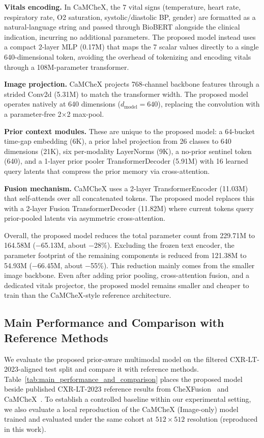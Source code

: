 \textbf{Vitals encoding.} In CaMCheX, the 7 vital signs (temperature, heart rate, respiratory rate, O2 saturation, systolic/diastolic BP, gender) are formatted as a natural-language string and passed through BioBERT alongside the clinical indication, incurring no additional parameters. The proposed model instead uses a compact 2-layer MLP (0.17M) that maps the 7 scalar values directly to a single 640-dimensional token, avoiding the overhead of tokenizing and encoding vitals through a 108M-parameter transformer.

\textbf{Image projection.} CaMCheX projects 768-channel backbone features through a strided Conv2d (5.31M) to match the transformer width. The proposed model operates natively at 640 dimensions ($d_\text{model} = 640$), replacing the convolution with a parameter-free 2$\times$2 max-pool.

\textbf{Prior context modules.} These are unique to the proposed model: a 64-bucket time-gap embedding (6K), a prior label projection from 26 classes to 640 dimensions (21K), six per-modality LayerNorms (9K), a no-prior sentinel token (640), and a 1-layer prior pooler TransformerDecoder (5.91M) with 16 learned query latents that compress the prior memory via cross-attention.

\textbf{Fusion mechanism.} CaMCheX uses a 2-layer TransformerEncoder (11.03M) that self-attends over all concatenated tokens. The proposed model replaces this with a 2-layer Fusion TransformerDecoder (11.82M) where current tokens query prior-pooled latents via asymmetric cross-attention.

Overall, the proposed model reduces the total parameter count from 229.71M to 164.58M ($-$65.13M, about $-$28\%). Excluding the frozen text encoder, the parameter footprint of the remaining components is reduced from 121.38M to 54.93M ($-$66.45M, about $-$55\%). This reduction mainly comes from the smaller image backbone. Even after adding prior pooling, cross-attention fusion, and a dedicated vitals projector, the proposed model remains smaller and cheaper to train than the CaMCheX-style reference architecture.


\subsection{Main Performance and Comparison with Reference Methods}
\label{subsec:results_quantitative}

We evaluate the proposed prior-aware multimodal model on the filtered CXR-LT-2023-aligned test split and compare it with reference methods. Table~\ref{tab:main_performance_and_comparison} places the proposed model beside published CXR-LT-2023 reference results from CheXFusion~\cite{kim2023chexfusion} and CaMCheX~\cite{sloan2025camchex}. To establish a controlled baseline within our experimental setting, we also evaluate a local reproduction of the CaMCheX (Image-only) model trained and evaluated under the same cohort at $512 \times 512$ resolution (reproduced in this work).

